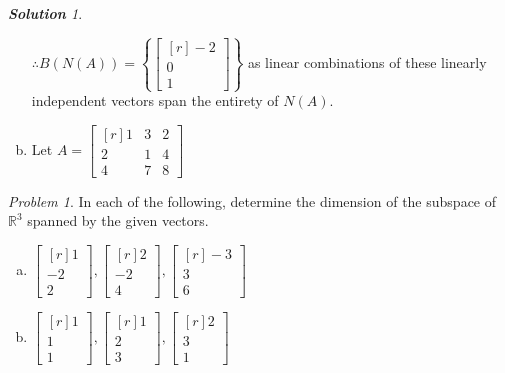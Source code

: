 \documentclass[12pt, letterpaper]{article}
\theoremstyle{remark}
\newtheorem{problem}{Problem}
\theoremstyle{remark}
\newtheorem*{solution}{\textbf{Solution}}
\begin{document}
\begin{solution}
\begin{enumerate}[(a)]
              \(\therefore B(N(A)) = \left\{\begin{bmatrix*}[r]
                -2 \\
                0 \\
                1
            \end{bmatrix*}\right\}\) as linear combinations of these
            linearly independent vectors span the entirety of \(N(A)\).

            \bigskip

        \item Let \( A =
		      \begin{bmatrix*}[r]
			      1 & 3 & 2 \\
			      2 & 1 & 4 \\
			      4 & 7 & 8
		      \end{bmatrix*}
		      \)

	\end{enumerate}

\end{solution}

\begin{problem}

In each of the following, determine the dimension
of the subspace of \(\mathbb{R}^3\) spanned by the given vectors.

\begin{enumerate}[(a)]
	\item \(
	      \begin{bmatrix*}[r]
		      1 \\
		      -2 \\
		      2
	      \end{bmatrix*},
	      \begin{bmatrix*}[r]
		      2 \\
		      -2 \\
		      4
	      \end{bmatrix*},
	      \begin{bmatrix*}[r]
		      -3 \\
		      3 \\
		      6
	      \end{bmatrix*}
	      \)
	\item \(
	      \begin{bmatrix*}[r]
		      1 \\
		      1 \\
		      1
	      \end{bmatrix*},
	      \begin{bmatrix*}[r]
		      1 \\
		      2 \\
		      3
	      \end{bmatrix*},
	      \begin{bmatrix*}[r]
		      2 \\
		      3 \\
		      1
	      \end{bmatrix*}
	      \)

\end{enumerate}

\end{problem}
\end{document}
